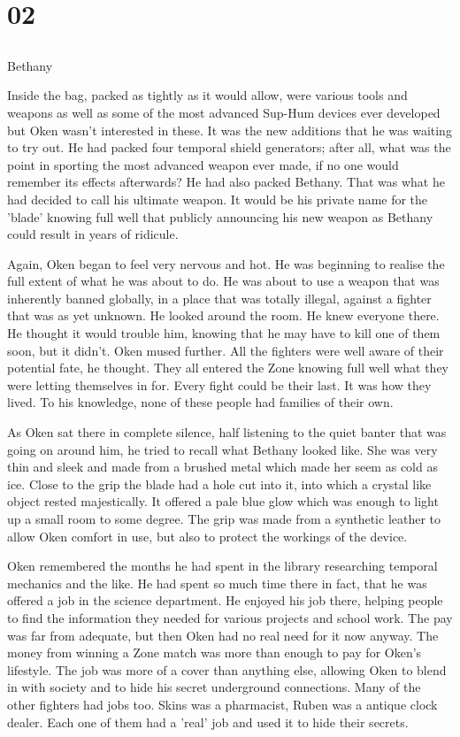 \chapter{02}
\section{}
Bethany  

Inside the bag, packed as tightly as it would allow, were various tools and weapons as well as some of the most advanced Sup-Hum devices ever developed but Oken wasn't interested in these.  It was the new additions that he was waiting to try out.  He had packed four temporal shield generators; after all, what was the point in sporting the most advanced weapon ever made, if no one would remember its effects afterwards?  He had also packed Bethany.  That was what he had decided to call his ultimate weapon.  It would be his private name for the 'blade' knowing full well that publicly announcing his new weapon as Bethany could result in years of ridicule.  

Again, Oken began to feel very nervous and hot.  He was beginning to realise the full extent of what he was about to do.  He was about to use a weapon that was inherently banned globally, in a place that was totally illegal, against a fighter that was as yet unknown.  He looked around the room.  He knew everyone there.  He thought it would trouble him, knowing that he may have to kill one of them soon, but it didn't.  Oken mused further.  All the fighters were well aware of their potential fate, he thought.  They all entered the Zone knowing full well what they were letting themselves in for.  Every fight could be their last.  It was how they lived.  To his knowledge, none of these people had families of their own. 

As Oken sat there in complete silence, half listening to the quiet banter that was going on around him, he tried to recall what Bethany looked like.  She was very thin and sleek and made from a brushed metal which made her seem as cold as ice.  Close to the grip the blade had a hole cut into it, into which a crystal like object rested majestically.  It offered a pale blue glow which was enough to light up a small room to some degree.  The grip was made from a synthetic leather to allow Oken comfort in use, but also to protect the workings of the device.   

Oken remembered the months he had spent in the library researching temporal mechanics and the like.  He had spent so much time there in fact, that he was offered a job in the science department.  He enjoyed his job there, helping people to find the information they needed for various projects and school work.  The pay was far from adequate, but then Oken had no real need for it now anyway.  The money from winning a Zone match was more than enough to pay for Oken's lifestyle.  The job was more of a cover than anything else, allowing Oken to blend in with society and to hide his secret underground connections.  Many of the other fighters had jobs too.  Skins was a pharmacist, Ruben was a antique clock dealer.  Each one of them had a 'real' job and used it to hide their secrets.

